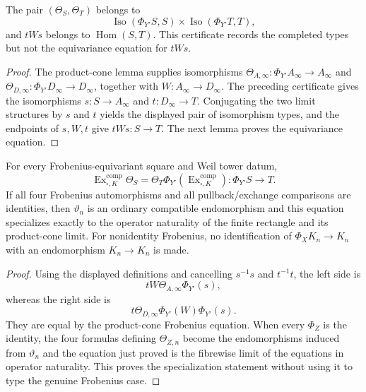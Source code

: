 \begin{lemma}
\label{lemma:weil-sf-well-defined-def-weil-pbc-completed-frobenius-structures}
The pair $(\Theta_S,\Theta_T)$ belongs to
\[
 \operatorname{Iso}(\Phi_{Y'}S,S)\times
 \operatorname{Iso}(\Phi_{Y'}T,T),
\]
and $tWs$ belongs to $\operatorname{Hom}(S,T)$.  This certificate records
the completed types but not the equivariance equation for $tWs$.
\end{lemma}
\begin{proof}
The product-cone lemma supplies isomorphisms
$\Theta_{A,\infty}:\Phi_{Y'}A_\infty\to A_\infty$ and
$\Theta_{D,\infty}:\Phi_{Y'}D_\infty\to D_\infty$, together with
$W:A_\infty\to D_\infty$.  The preceding certificate gives the
isomorphisms $s:S\to A_\infty$ and $t:D_\infty\to T$.  Conjugating the two
limit structures by $s$ and $t$ yields the displayed pair of isomorphism
types, and the endpoints of $s,W,t$ give $tWs:S\to T$.  The next lemma
proves the equivariance equation.
\end{proof}
\begin{lemma}
\label{lemma:weil-pbc-completed-frobenius-equivariance}
For every Frobenius-equivariant square and Weil tower datum,
\[
 \operatorname{Ex}^{\mathrm{comp}}_{\square,K}\Theta_S
 =\Theta_T\Phi_{Y'}
   (\operatorname{Ex}^{\mathrm{comp}}_{\square,K}):
 \Phi_{Y'}S\longrightarrow T.
\]
If all four Frobenius automorphisms and all pullback/exchange comparisons are
identities, then $\vartheta_n$ is an ordinary compatible endomorphism and
this equation specializes exactly to the operator naturality of the finite
rectangle and its product-cone limit.  For nonidentity Frobenius, no
identification of $\Phi_XK_n\to K_n$ with an endomorphism $K_n\to K_n$ is
made.
\end{lemma}
\begin{proof}

Using the displayed definitions and cancelling $s^{-1}s$ and $t^{-1}t$,
the left side is
\[
 tW\Theta_{A,\infty}\Phi_{Y'}(s),
\]
whereas the right side is
\[
 t\Theta_{D,\infty}\Phi_{Y'}(W)\Phi_{Y'}(s).
\]
They are equal by the product-cone Frobenius equation.  When every
$\Phi_Z$ is the identity, the four formulas defining $\Theta_{Z,n}$ become
the endomorphisms induced from $\vartheta_n$ and the equation just proved is
the fibrewise limit of the equations in operator naturality.  This proves
the specialization statement without using it to type the genuine
Frobenius case.
\end{proof}

